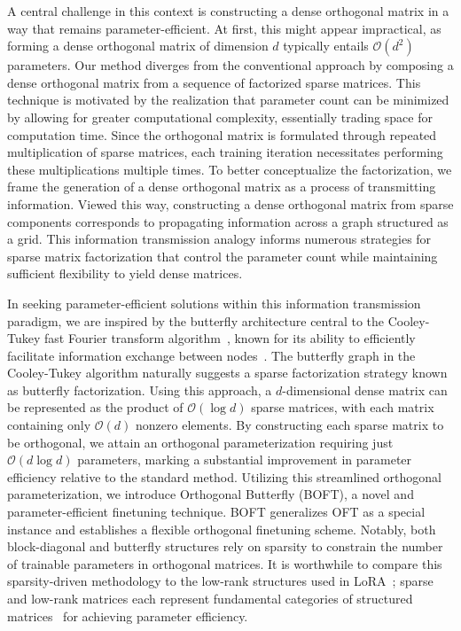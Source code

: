A central challenge in this context is constructing a dense orthogonal matrix in a way that remains parameter-efficient. At first, this might appear impractical, as forming a dense orthogonal matrix of dimension $d$ typically entails $\mathcal{O}(d^2)$ parameters. Our method diverges from the conventional approach by composing a dense orthogonal matrix from a sequence of factorized sparse matrices. This technique is motivated by the realization that parameter count can be minimized by allowing for greater computational complexity, essentially trading space for computation time. Since the orthogonal matrix is formulated through repeated multiplication of sparse matrices, each training iteration necessitates performing these multiplications multiple times. To better conceptualize the factorization, we frame the generation of a dense orthogonal matrix as a process of transmitting information. Viewed this way, constructing a dense orthogonal matrix from sparse components corresponds to propagating information across a graph structured as a grid. This information transmission analogy informs numerous strategies for sparse matrix factorization that control the parameter count while maintaining sufficient flexibility to yield dense matrices.

In seeking parameter-efficient solutions within this information transmission paradigm, we are inspired by the butterfly architecture central to the Cooley-Tukey fast Fourier transform algorithm~\cite{cooley1965algorithm}, known for its ability to efficiently facilitate information exchange between nodes~\cite{klasing1994broadcasting}. The butterfly graph in the Cooley-Tukey algorithm naturally suggests a sparse factorization strategy known as butterfly factorization. Using this approach, a $d$-dimensional dense matrix can be represented as the product of $\mathcal{O}(\log d)$ sparse matrices, with each matrix containing only $\mathcal{O}(d)$ nonzero elements. By constructing each sparse matrix to be orthogonal, we attain an orthogonal parameterization requiring just $\mathcal{O}(d\log d)$ parameters, marking a substantial improvement in parameter efficiency relative to the standard method. Utilizing this streamlined orthogonal parameterization, we introduce Orthogonal Butterfly (BOFT), a novel and parameter-efficient finetuning technique. BOFT generalizes OFT as a special instance and establishes a flexible orthogonal finetuning scheme. Notably, both block-diagonal and butterfly structures rely on sparsity to constrain the number of trainable parameters in orthogonal matrices. It is worthwhile to compare this sparsity-driven methodology to the low-rank structures used in LoRA~\cite{hulora2022}; sparse and low-rank matrices each represent fundamental categories of structured matrices~\cite{candes2011robust} for achieving parameter efficiency.

